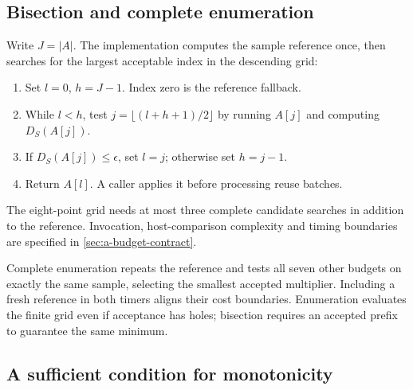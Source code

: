 \subsection{Bisection and complete enumeration}

Write $J=|A|$. The implementation computes the sample reference once,
then searches for the largest acceptable index in the descending grid:
\par\noindent\begin{minipage}{\linewidth}
\begin{enumerate}[leftmargin=*,itemsep=0.15em]
\item Set $l=0$, $h=J-1$. Index zero is the reference fallback.
\item While $l<h$, test $j=\lfloor(l+h+1)/2\rfloor$ by running
$A[j]$ and computing $D_S(A[j])$.
\item If $D_S(A[j])\leq\epsilon$, set $l=j$; otherwise set $h=j-1$.
\item Return $A[l]$. A caller applies it before processing reuse batches.
\end{enumerate}
\end{minipage}\par\medskip
The eight-point grid needs at most three complete candidate searches
in addition to the reference. Invocation, host-comparison complexity and
timing boundaries are specified in \cref{sec:a-budget-contract}.

Complete enumeration repeats the reference and tests all seven other
budgets on exactly the same sample, selecting the smallest accepted
multiplier. Including a fresh reference in both timers aligns their cost
boundaries. Enumeration evaluates the finite grid even if acceptance has
holes; bisection requires an accepted prefix to guarantee the same minimum.

\subsection{A sufficient condition for monotonicity}


